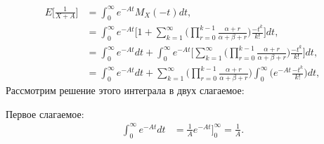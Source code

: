 \documentclass[13pt]{article}
\begin{document}
\begin{align*}
    E\bigg[\frac{1}{X+A}\bigg] &=  \int_{0}^{\infty} e^{-At}M_{X}(-t)dt, \\
    &= \int_{0}^{\infty} e^{-At} \bigg[1 + \sum_{k=1}^{\infty}\Bigg( \prod_{r=0}^{k-1} \frac{\alpha + r}{\alpha + \beta + r}\Bigg)\frac{-t^{k}}{k!}\bigg]dt, \\
    &= \int_{0}^{\infty} e^{-At} dt + \int_{0}^{\infty} e^{-At}\bigg[ \sum_{k=1}^{\infty}\Bigg( \prod_{r=0}^{k-1} \frac{\alpha + r}{\alpha + \beta + r}\Bigg)\frac{-t^{k}}{k!}\bigg]dt, \\
    &= \int_{0}^{\infty} e^{-At} dt + \sum_{k=1}^{\infty}\Bigg( \prod_{r=0}^{k-1} \frac{\alpha + r}{\alpha + \beta + r}\Bigg)\int_{0}^{\infty}\Big( e^{-At}\frac{-t^{k}}{k!} \Big)dt,
\end{align*}
Рассмотрим решение этого интеграла в двух слагаемое:

Первое слагаемое:
\begin{align*}
     \int_{0}^{\infty} e^{-At} dt &=  \frac{1}{A} e^{-At}\Bigg]_{0}^{\infty} = \frac{1}{A}.
\end{align*}
\end{document}
